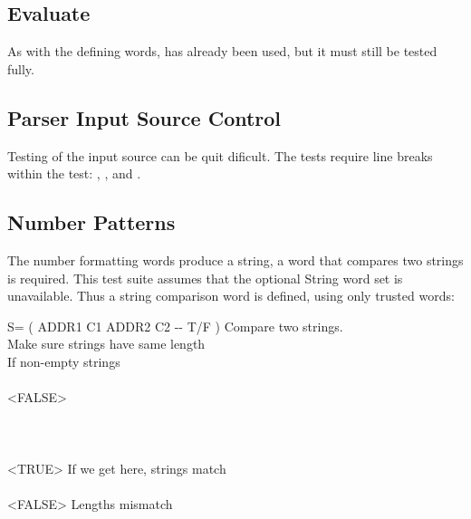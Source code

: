 \subsection{Evaluate}

As with the defining words,  has
already been used, but it must still be tested fully.

\subsection{Parser Input Source Control}

Testing of the input source can be quit dificult.  The tests
require line breaks within the test:
	,
	, and
	.

\subsection{Number Patterns}

The number formatting words produce a string, a word that compares
two strings is required.  This test suite assumes that the optional
String word set is unavailable.  Thus a string comparison word is
defined, using only trusted words:

\begin{tt}
\word{:} S=   ( ADDR1 C1 ADDR2 C2 -{}- T/F ) Compare two strings. \\
\tab  {}   \word{=} 	\tab[4.8]  Make sure strings have same length \\
\tab[2]     				\tab[6.2]  If non-empty strings \\
  \\
\tab[4]           \word{-}
				  <FALSE>    \\
\tab[4]           \\
\tab[3]      \\
\tab[2]    \\
\tab[2]    <TRUE>								\tab[5]  If we get here, strings match \\
\tab  {} \\
\tab[2]      <FALSE>		\tab[-0.4]  Lengths mismatch \\
\tab  {} \word{;}
\end{tt}

